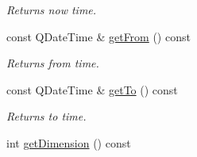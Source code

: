 \begin{DoxyCompactItemize}
\begin{DoxyCompactList}\small\item\em Returns \textquotesingle{}now\textquotesingle{} time. \end{DoxyCompactList}\item 
const Q\+Date\+Time \& \hyperlink{classGKContext_ac23f3d09d708ca57f24601792c0318e8}{get\+From} () const \hypertarget{classGKContext_ac23f3d09d708ca57f24601792c0318e8}{}\label{classGKContext_ac23f3d09d708ca57f24601792c0318e8}

\begin{DoxyCompactList}\small\item\em Returns \textquotesingle{}from\textquotesingle{} time. \end{DoxyCompactList}\item 
const Q\+Date\+Time \& \hyperlink{classGKContext_aa4203db94958da803c123d0db06e13d7}{get\+To} () const \hypertarget{classGKContext_aa4203db94958da803c123d0db06e13d7}{}\label{classGKContext_aa4203db94958da803c123d0db06e13d7}

\begin{DoxyCompactList}\small\item\em Returns \textquotesingle{}to\textquotesingle{} time. \end{DoxyCompactList}\item 
int \hyperlink{classGKContext_ac694a50af913b0a2e23fbcfdb9c59b1a}{get\+Dimension} () const \hypertarget{classGKContext_ac694a50af913b0a2e23fbcfdb9c59b1a}{}\label{classGKContext_ac694a50af913b0a2e23fbcfdb9c59b1a}


\end{DoxyCompactItemize}
